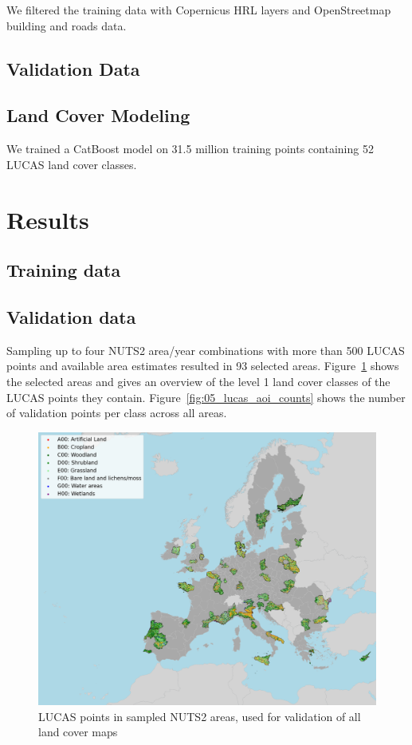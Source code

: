 We filtered the training data with Copernicus HRL layers and OpenStreetmap building and roads data. 

\subsection{Validation Data}

\subsection{Land Cover Modeling}
We trained a CatBoost model \citep{prokhorenkova2018catboost,hancock2020catboost} on 31.5 million training points containing 52 LUCAS land cover classes.



\section{Results}
\subsection{Training data}



\subsection{Validation data}

Sampling up to four NUTS2 area/year combinations with more than 500 LUCAS points and available area estimates resulted in 93 selected areas. Figure~\ref{fig:05_lucas_aoi} shows the selected areas and gives an overview of the level 1 land cover classes of the LUCAS points they contain. Figure~\ref{fig:05_lucas_aoi_counts} shows the number of validation points per class across all areas.

\begin{figure}[h]
    \centering
    \includegraphics[width=\textwidth]{figs_05/fig_lucas_aoi.png}
    \caption{LUCAS points in sampled NUTS2 areas, used for validation of all land cover maps}
    \label{fig:05_lucas_aoi}
\end{figure}

